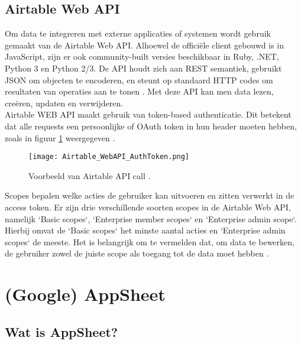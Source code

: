 \subsection{Airtable Web API}
\label{subsec:airtable_web_API}


Om data te integreren met externe applicaties of systemen wordt gebruik gemaakt van de Airtable Web API. Alhoewel de officiële client gebouwd is in JavaScript, zijn er ook community-built versies beschikbaar in Ruby, .NET, Python 3 en Python 2/3. De API houdt zich aan REST semantiek, gebruikt JSON om objecten te encoderen, en steunt op standaard HTTP codes om resultaten van operaties aan te tonen \autocite{AirtableAPI}. Met deze API kan men data lezen, creëren, updaten en verwijderen. \\

Airtable WEB API maakt gebruik van token-based authenticatie. Dit betekent dat alle requests een persoonlijke of OAuth token in hun header moeten hebben, zoals in figuur \ref{fig:airtable_authtoken} weergegeven \autocite{AirtableAPIAuthentication}. \\

\begin{figure}[hb]
    \centering
    \texttt{[image: Airtable\_WebAPI\_AuthToken.png]}
    \caption[Voorbeeld Airtable API call]{Voorbeeld van Airtable API call \autocite{AirtableAPIAuthentication}.}
    \label{fig:airtable_authtoken}
\end{figure}

Scopes bepalen welke acties de gebruiker kan uitvoeren en zitten verwerkt in de access token. Er zijn drie verschillende soorten scopes in de Airtable Web API, namelijk `Basic scopes`, `Enterprise member scopes` en `Enterprise admin scope`. Hierbij omvat de `Basic scopes` het minste aantal acties en `Enterprise admin scopes` de meeste. Het is belangrijk om te vermelden dat, om data te bewerken, de gebruiker zowel de juiste scope als toegang tot de data moet hebben \autocite{AirtableAPIScopes}. \\

\section{(Google) AppSheet}
\label{sec:Appsheet}


\subsection{Wat is AppSheet?}
\label{subsec:wat_is_appsheet}

